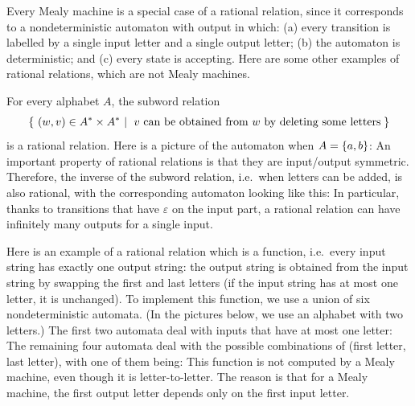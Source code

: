 Every Mealy machine is a special case of a rational relation, since it corresponds to a nondeterministic automaton with output in which: (a) every transition is labelled by a single input letter and a single output letter; (b) the automaton is deterministic; and (c) every state is accepting. Here are some other examples of rational relations, which are not Mealy machines.

\begin{myexample}
    For every alphabet $A$, the subword relation 
    \begin{align*}
    \setbuild{ (w,v) \in A^* \times A^*}{$v$ can be obtained from $w$ by deleting some letters}
    \end{align*}
    is a rational relation. Here is a picture of the automaton when $A = \{a,b\}$: 
    An important property of rational relations is that they are input/output symmetric. Therefore, the inverse of the subword relation, i.e.~when letters can be added, is also rational, with the corresponding automaton looking like this:
    In particular, thanks to transitions that have $\varepsilon$ on the input part, a rational relation can have infinitely many outputs for a single input.
\end{myexample}

\begin{myexample}
 Here is an example of a rational relation which is a function, i.e.~every input string has exactly one output string: the output string is obtained from the input string by swapping the first and last letters (if the input string has at most one letter, it is unchanged). To implement this function, we use a union of six nondeterministic automata. (In the pictures below, we use an alphabet with two letters.) The first two automata deal with inputs that have at most one letter:
The remaining four automata deal with the possible combinations of (first letter, last letter), with one of them being:
This function is not computed by a Mealy machine, even though it is letter-to-letter. The reason is that for a Mealy machine, the first output letter depends only on the first input letter.
\end{myexample}


